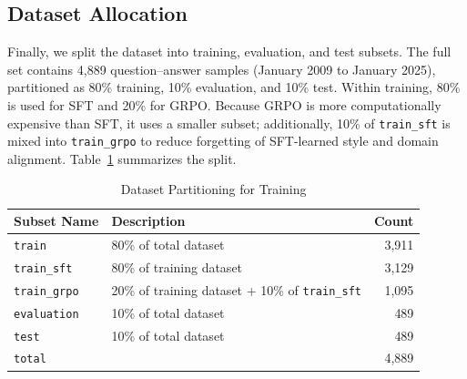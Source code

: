 

\subsection*{Dataset Allocation}


Finally, we split the dataset into training, evaluation, and test subsets. The full set contains 4,889 question--answer samples (January 2009 to January 2025), partitioned as 80\% training, 10\% evaluation, and 10\% test. Within training, 80\% is used for SFT and 20\% for GRPO. Because GRPO is more computationally expensive than SFT, it uses a smaller subset; additionally, 10\% of \texttt{train\_sft} is mixed into \texttt{train\_grpo} to reduce forgetting of SFT-learned style and domain alignment. Table~\ref{tab:ch2:dataset_partition_stage1} summarizes the split.



\begin{table}[htbp]
\centering
\footnotesize
\begin{tabular}{l l r}
\toprule
\textbf{Subset Name} & \textbf{Description} & \textbf{Count} \\
\midrule
\texttt{train} & 80\% of total dataset & 3,911 \\
\texttt{train\_sft} & 80\% of training dataset & 3,129 \\
\texttt{train\_grpo} & 20\% of training dataset + 10\% of \texttt{train\_sft} & 1,095 \\
\midrule
\texttt{evaluation} & 10\% of total dataset & 489 \\
\texttt{test} & 10\% of total dataset & 489 \\
\midrule
\texttt{total} &  & 4,889 \\
\bottomrule
\end{tabular}
\caption{Dataset Partitioning for Training}
\label{tab:ch2:dataset_partition_stage1}
\end{table}


